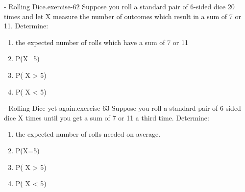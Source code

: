 \documentclass[10pt,]{book}
\numberwithin{equation}{section}
\begin{document}
%
\par
\hypertarget{p-933}{}%
\begin{inlineexercise}{- Rolling Dice.}{exercise-62}%
\hypertarget{p-934}{}%
Suppose you roll a standard pair of 6-sided dice 20 times and let X measure the number of outcomes which result in a sum of 7 or 11. Determine: \leavevmode%
\begin{enumerate}
\item\hypertarget{li-279}{}the expected number of rolls which have a sum of 7 or 11%
\item\hypertarget{li-280}{}P(X=5)%
\item\hypertarget{li-281}{}P( X > 5)%
\item\hypertarget{li-282}{}P( X < 5)%
\end{enumerate}
%
\end{inlineexercise}
%
\par
\hypertarget{p-935}{}%
\begin{inlineexercise}{- Rolling Dice yet again.}{exercise-63}%
\hypertarget{p-936}{}%
Suppose you roll a standard pair of 6-sided dice X times until you get a sum of 7 or 11 a third time. Determine: \leavevmode%
\begin{enumerate}
\item\hypertarget{li-283}{}the expected number of rolls needed on average.%
\item\hypertarget{li-284}{}P(X=5)%
\item\hypertarget{li-285}{}P( X > 5)%
\item\hypertarget{li-286}{}P( X < 5)%
\end{enumerate}
%
\end{inlineexercise}
%
\par
\hypertarget{p-937}{}%
\end{document}
